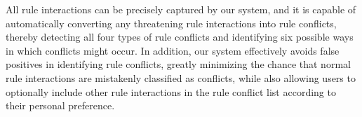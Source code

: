 All rule interactions can be precisely captured by our system, and it is capable of automatically converting any threatening rule interactions into rule conflicts, thereby detecting all four types of rule conflicts and identifying six possible ways in which conflicts might occur. In addition, our system effectively avoids false positives in identifying rule conflicts, greatly minimizing the chance that normal rule interactions are mistakenly classified as conflicts, while also allowing users to optionally include other rule interactions in the rule conflict list according to their personal preference.

